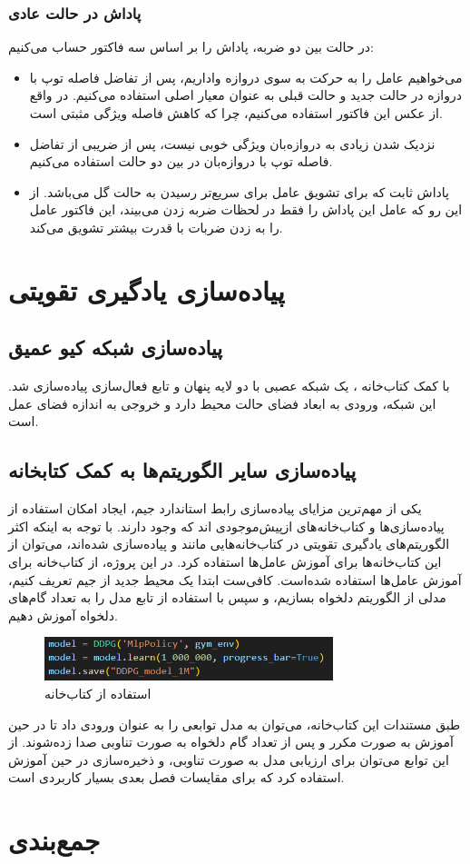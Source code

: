 \subsubsection{پاداش در حالت عادی}
در حالت بین دو ضربه، پاداش را بر اساس سه فاکتور حساب می‌کنیم:
\begin{itemize}
    \item می‌خواهیم عامل را به حرکت به سوی دروازه واداریم، پس از تفاضل فاصله توپ با دروازه در حالت جدید و حالت قبلی به عنوان معیار اصلی استفاده می‌کنیم. در واقع از عکس این فاکتور استفاده می‌کنیم، چرا که کاهش فاصله ویژگی مثبتی است.
    \item نزدیک شدن زیادی به دروازه‌بان ویژگی خوبی نیست، پس از ضریبی از تفاضل فاصله توپ با دروازه‌بان در بین دو حالت استفاده می‌کنیم.
    \item پاداش ثابت  که برای تشویق عامل برای سریع‌تر رسیدن به حالت گل می‌باشد. از این رو که عامل این پاداش را فقط در لحظات ضربه زدن می‌بیند، این فاکتور عامل را به زدن ضربات با قدرت بیشتر تشویق می‌کند.
\end{itemize}
\section{پیاده‌سازی یادگیری تقویتی}
\subsection{پیاده‌سازی شبکه کیو عمیق}
با کمک کتاب‌خانه ،
یک شبکه عصبی با دو لایه پنهان و تابع فعال‌سازی  پیاده‌سازی شد.
این شبکه، ورودی به ابعاد فضای حالت محیط دارد و خروجی به اندازه فضای عمل است.

\subsection{پیاده‌سازی سایر الگوریتم‌ها به کمک کتابخانه}
یکی از مهم‌ترین مزایای پیاده‌سازی رابط استاندارد جیم، ایجاد امکان استفاده از پیاده‌سازی‌ها و کتاب‌خانه‌های از‌پیش‌موجودی اند که وجود دارند.
با توجه به اینکه اکثر الگوریتم‌های یادگیری تقویتی در کتاب‌خانه‌هایی مانند  و  پیاده‌سازی شده‌اند،
می‌توان از این کتاب‌خانه‌ها برای آموزش عامل‌ها استفاده کرد.
در این پروژه، از کتاب‌خانه  برای آموزش عامل‌ها استفاده شده‌است.
کافی‌ست ابتدا یک محیط جدید از جیم تعریف کنیم، مدلی از الگوریتم دلخواه بسازیم، و سپس با استفاده از تابع 
مدل را به تعداد گام‌های دلخواه آموزش دهیم.
\begin{figure}[H]
    \centering
    \includegraphics[width=0.75\textwidth]{images/sb3.png}
    \caption{استفاده از کتاب‌خانه }\label{fig:sb3}
\end{figure}
طبق مستندات این کتاب‌خانه، می‌توان به مدل توابعی را به عنوان ورودی داد تا در حین آموزش به صورت مکرر و پس از تعداد گام دلخواه به صورت تناوبی صدا زده‌شوند.
 از این توابع می‌توان برای ارزیابی مدل به صورت تناوبی، و ذخیره‌سازی در حین آموزش استفاده کرد که برای مقایسات فصل بعدی بسیار کاربردی است.
\section{جمع‌بندی}
